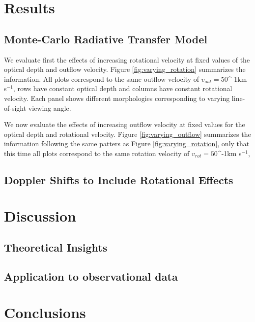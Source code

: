 \documentclass[a4paper,fleqn,usenatbib]{mnras}
\newcommand{\kms}{\ifmmode\mathrm{km\ s}^{-1}\else km s$^{-1}$\fi}
\begin{document}
\section{Results}
\label{sec:results}

\subsection{Monte-Carlo Radiative Transfer Model}

We evaluate first the effects of increasing rotational
velocity at fixed values of the optical depth and outflow velocity.
Figure \ref{fig:varying_rotation} summarizes the information.
All plots correspond to the same outflow velocity of $v_{out}=50$\kms,
rows have constant optical depth and columns have constant rotational
velocity.
Each panel shows different morphologies corresponding to varying
line-of-sight viewing angle.



We now evaluate the effects of increasing outflow velocity at fixed
values for the optical depth and rotational velocity.
Figure \ref{fig:varying_outflow} summarizes the information following
the same patters as Figure \ref{fig:varying_rotation}, only that this
time all plots correspond to the same rotation velocity of
$v_{rot}=50$\kms,




\subsection{Doppler Shifts to Include Rotational Effects}




\section{Discussion}
\label{sec:discussion}

\subsection{Theoretical Insights}

\subsection{Application to observational data}


\section{Conclusions}
\label{sec:conclusions}



\end{document}
